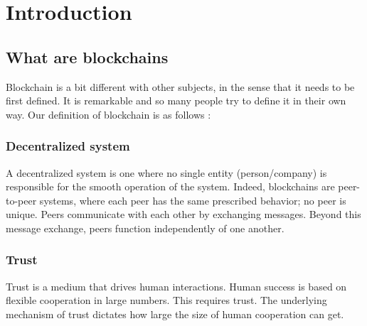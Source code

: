 \chapter{Introduction}
\section{What are blockchains}
Blockchain is a bit different with other subjects, in the sense that it needs to be first defined. It is remarkable and so many people try to define it in their own way. Our definition of blockchain is as follows :

\subsection*{Decentralized system}
A decentralized system is one where no single entity (person/company)
is responsible for the smooth operation of the system. Indeed, blockchains are peer-to-peer systems,
where each peer has the same prescribed behavior; no peer is unique. Peers communicate with each
other by exchanging messages. Beyond this message exchange, peers function independently of one
another.

\subsection*{Trust}
Trust is a medium that drives human interactions. Human success is based on flexible cooperation in large numbers. This requires trust. The underlying mechanism of trust dictates how large the size of human cooperation can get. 
